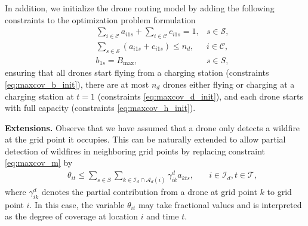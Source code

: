 \documentclass{article}
\newcommand{\set}[1]{\mathcal{#1}}
\begin{document}



In addition, we initialize the drone routing model by adding the following constraints to the optimization problem formulation
\begin{align}
    &\quad \displaystyle \sum_{i \in \set C} a_{i1s} + \sum_{i \in \set C} c_{i1s} = 1, &  s \in \set S, \label{eq:maxcov_b_init}\\
    &\quad \displaystyle \sum_{s \in \set S} (a_{i1s} + c_{i1s}) \leq n_d, & i \in \set C, \label{eq:maxcov_d_init}\\
    &\quad \displaystyle b_{1s} = B_{\text{max}}, & s \in S, \label{eq:maxcov_h_init}
\end{align}
ensuring that all drones start flying from a charging station (constraints \eqref{eq:maxcov_b_init}), there are at most $n_d$ drones either flying or charging at a charging station at $t = 1$ (constraints \eqref{eq:maxcov_d_init}), and each drone starts with full capacity (constraints \eqref{eq:maxcov_h_init}). 

\textbf{Extensions.}
Observe that we have assumed that a drone only detects a wildfire at the grid point it occupies. This can be naturally extended to allow partial detection of wildfires in neighboring grid points by replacing constraint \eqref{eq:maxcov_m} by 
\begin{align*}
            &\quad \displaystyle \theta_{it} \leq \sum_{s \in S} \sum_{k \in \set I_d \cap \set A_d(i)}\gamma_{ik}^d a_{kts}, &\quad i \in \set I_d, t \in \set T,
\end{align*}
where $\gamma_{ik}^d$ denotes the partial contribution from a drone at grid point $k$ to grid point $i$. In this case, the variable $\theta_{it}$ 
may take fractional values and is interpreted as the degree of coverage at location $i$ and time $t$.
\end{document}
